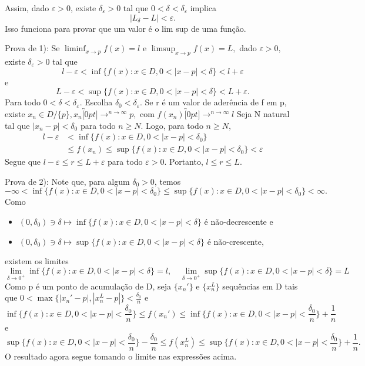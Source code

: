 \documentclass[analysis_notes.tex]{subfiles}
\begin{document}
Assim, dado $\varepsilon > 0$, existe $\delta_{\varepsilon}>0$ tal que $0 < \delta < \delta_{\varepsilon}$ implica
$$
	|L_{\delta}-L|< \varepsilon.
$$
Isso funciona para provar que um valor \'e o lim sup de uma fun\c c\~ao.
\begin{proof*}
	Prova de 1): Se $\liminf_{x\to p}f(x) = l$ e $\limsup_{x\to p}f(x) = L,$ dado $\varepsilon > 0,$ existe $\delta_{\varepsilon}>0$
	tal que
	$$
		l - \varepsilon < \inf{\{f(x):x\in D, 0<|x-p|<\delta\}} < l + \varepsilon
	$$
	e
	$$
		L - \varepsilon < \sup{\{f(x):x\in D, 0<|x-p|<\delta\}} < L + \varepsilon.
	$$
	Para todo $0<\delta<\delta_{\varepsilon}.$ Escolha $\delta_{0} < \delta_{\varepsilon}$. Se r \'e um valor de ader\^encia
	de f em p, existe $x_{n}\in D/\{p\}, x_{n}\overbracket[0pt]{\longrightarrow}^{n\to \infty}p,$ com $f(x_{n})\overbracket[0pt]{\longrightarrow}^{n\to \infty}l$
	Seja N natural tal que $|x_{n}-p| < \delta_{0}$ para todo $n\geq{N}.$ Logo, para todo $n\geq{N},$
	\begin{align*}
		l - \varepsilon & < \inf\{f(x):x\in D, 0 < |x-p| < \delta_{0}\}                              \\
		                & \leq{}f(x_{n})\leq{}\sup\{f(x):x\in D, 0 <|x-p|<\delta_{0}\} < \varepsilon
	\end{align*}
	Segue que $l-\varepsilon\leq{r}\leq{L+\varepsilon}$ para todo $\varepsilon > 0$. Portanto, $l\leq{r}\leq{L}.$

	Prova de 2): Note que, para algum $\delta_{0} > 0$, temos
	$$
		-\infty < \inf{\{f(x):x\in D, 0 < |x-p|< \delta_{0}\}}\leq{}\sup\{f(x):x\in D, 0 < |x-p| <\delta_{0}\} < \infty.
	$$
	Como
	\begin{itemize}
		\item $(0, \delta_{0})\ni\delta\mapsto\inf\{f(x):x\in D, 0<|x-p|<\delta\}$ \'e n\~ao-decrescente e
		\item $(0, \delta_{0})\ni\delta\mapsto\sup\{f(x):x\in D, 0<|x-p|<\delta\}$ \'e n\~ao-crescente,
	\end{itemize}
	existem os limites
	$$
		\lim_{\delta\to 0^{+}}\inf\{f(x):x\in D, 0 < |x-p| < \delta\} = l, \quad\lim_{\delta\to 0^{+}}\sup\{f(x):x\in D, 0 < |x-p| < \delta\} = L
	$$
	Como p \'e um ponto de acumula\c c\~ao de D, seja $\{x_{n}'\}$ e $\{x_{n}^{L}\}$ sequ\^encias em D tais que $0<\max\{|x_{n}'-p|, |x_{n}^{L}-p|\}<\frac{\delta_{0}}{n}$
	e
	$$
		\inf{\{f(x):x\in D, 0 < |x-p| < \frac{\delta_{0}}{n}\}}\leq{f(x_{n}')}\leq{}\inf{\{f(x):x \in D, 0 <|x-p|<\frac{\delta_{0}}{n}\}} + \frac{1}{n}
	$$
	e
	$$
		\sup{\{f(x):x\in D, 0 < |x-p| < \frac{\delta_{0}}{n}\}}-\frac{\delta_{0}}{n}\leq{f(x_{n}^{L})}\leq{}\sup{\{f(x):x \in D, 0 <|x-p|<\frac{\delta_{0}}{n}\}} + \frac{1}{n}.
	$$
	O resultado agora segue tomando o limite nas express\~oes acima.


\end{proof*}
\end{document}
